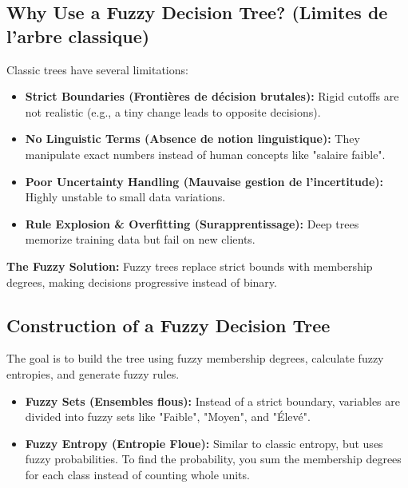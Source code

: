\documentclass[11pt,a4paper]{article}
\begin{document}
\subsection{Why Use a Fuzzy Decision Tree? (Limites de l'arbre classique)}
Classic trees have several limitations:
\begin{itemize}
    \item \textbf{Strict Boundaries (Frontières de décision brutales):} Rigid cutoffs are not realistic (e.g., a tiny change leads to opposite decisions).
    \item \textbf{No Linguistic Terms (Absence de notion linguistique):} They manipulate exact numbers instead of human concepts like "salaire faible".
    \item \textbf{Poor Uncertainty Handling (Mauvaise gestion de l'incertitude):} Highly unstable to small data variations.
    \item \textbf{Rule Explosion \& Overfitting (Surapprentissage):} Deep trees memorize training data but fail on new clients.
\end{itemize}
\textbf{The Fuzzy Solution:} Fuzzy trees replace strict bounds with membership degrees, making decisions progressive instead of binary.

\subsection{Construction of a Fuzzy Decision Tree}
The goal is to build the tree using fuzzy membership degrees, calculate fuzzy entropies, and generate fuzzy rules.
\begin{itemize}
    \item \textbf{Fuzzy Sets (Ensembles flous):} Instead of a strict boundary, variables are divided into fuzzy sets like "Faible", "Moyen", and "Élevé".
    \item \textbf{Fuzzy Entropy (Entropie Floue):} Similar to classic entropy, but uses fuzzy probabilities. To find the probability, you sum the membership degrees for each class instead of counting whole units.
\end{itemize}
\end{document}

